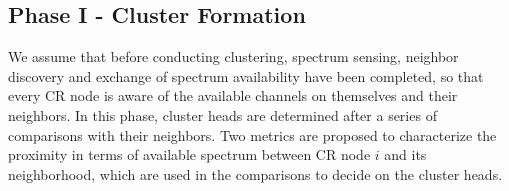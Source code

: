 \documentclass[10pt,journal,compsoc]{IEEEtran}
\theoremstyle{mytheoremstyle}
\theoremstyle{mytheoremstyle}
\theoremstyle{mytheoremstyle}
\begin{document}
	

\subsection{Phase I - Cluster Formation}
\label{phaseI}
We assume that before conducting clustering, spectrum sensing, neighbor discovery and exchange of spectrum availability have been completed, so that every CR node is aware of the available channels on themselves and their neighbors.
In this phase, cluster heads are determined after a series of comparisons with their neighbors. 
Two metrics are proposed to characterize the proximity in terms of available spectrum between CR node $i$ and its neighborhood, which are used in the comparisons to decide on the cluster heads.


\end{document}
